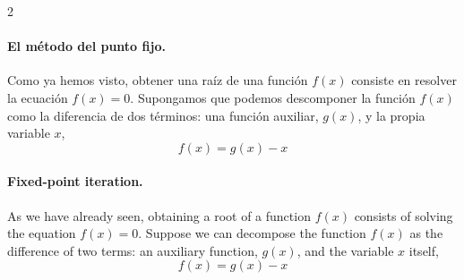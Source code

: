 \begin{paracol}{2}
\paragraph{El método del punto fijo.} Como ya hemos visto, obtener una raíz de una función $f(x)$ consiste en resolver la ecuación $f(x)=0$. Supongamos que podemos descomponer la función $f(x)$ como la diferencia de dos términos: una función auxiliar, $g(x)$, y la propia variable $x$,
\begin{equation*}
f(x)=g(x)-x
\end{equation*}
\switchcolumn
\paragraph{Fixed-point iteration.} As we have already seen, obtaining a root of a function $f(x)$ consists of solving the equation $f(x)=0$. Suppose we can decompose the function $f(x)$ as the difference of two terms: an auxiliary function, $g(x)$, and the variable $x$ itself,
\begin{equation*}
f(x)=g(x)-x
\end{equation*}

\end{paracol}

